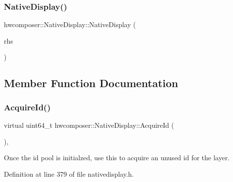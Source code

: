 \mbox{\label{classhwcomposer_1_1NativeDisplay_a6a0f2bcc4891497114cefa9fa8dd73f2}} 
\subsubsection{\texorpdfstring{Native\+Display()}{NativeDisplay()}\hspace{0.1cm}{\footnotesize\ttfamily [2/2]}}
{\footnotesize\ttfamily hwcomposer\+::\+Native\+Display\+::\+Native\+Display (\begin{DoxyParamCaption}\item[{const \mbox{\hyperlink{classhwcomposer_1_1NativeDisplay}{Native\+Display}} \&}]{rhs }\end{DoxyParamCaption})\hspace{0.3cm}{\ttfamily [delete]}}



\subsection{Member Function Documentation}
\mbox{\label{classhwcomposer_1_1NativeDisplay_a20416186adee927aa4a72dd9ae1b0e87}} 
\subsubsection{\texorpdfstring{Acquire\+Id()}{AcquireId()}}
{\footnotesize\ttfamily virtual uint64\+\_\+t hwcomposer\+::\+Native\+Display\+::\+Acquire\+Id (\begin{DoxyParamCaption}{ }\end{DoxyParamCaption})\hspace{0.3cm}{\ttfamily [inline]}, {\ttfamily [virtual]}}

Once the id pool is initialzed, use this to acquire an unused id for the layer. 

Definition at line 379 of file nativedisplay.\+h.


